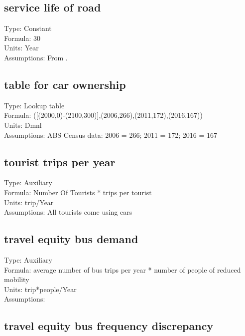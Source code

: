 \documentclass[
  11pt,
]{book}
\begin{document}
\hypertarget{service-life-of-road}{%
\subsection{service life of road}\label{service-life-of-road}}

Type: Constant\\
Formula: 30\\
Units: Year\\
Assumptions: From \citet{fallah-fini_measuring_2015}.

\hypertarget{table-for-car-ownership}{%
\subsection{table for car ownership}\label{table-for-car-ownership}}

Type: Lookup table\\
Formula: ({[}(2000,0)-(2100,300){]},(2006,266),(2011,172),(2016,167))\\
Units: Dmnl\\
Assumptions: ABS Census data: 2006 = 266; 2011 = 172; 2016 = 167

\hypertarget{tourist-trips-per-year}{%
\subsection{tourist trips per year}\label{tourist-trips-per-year}}

Type: Auxiliary\\
Formula: Number Of Tourists * trips per tourist\\
Units: trip/Year\\
Assumptions: All tourists come using cars

\hypertarget{travel-equity-bus-demand}{%
\subsection{travel equity bus demand}\label{travel-equity-bus-demand}}

Type: Auxiliary\\
Formula: average number of bus trips per year * number of people of reduced mobility\\
Units: trip*people/Year\\
Assumptions:

\hypertarget{travel-equity-bus-frequency-discrepancy}{%
\subsection{travel equity bus frequency discrepancy}\label{travel-equity-bus-frequency-discrepancy}}
\end{document}
